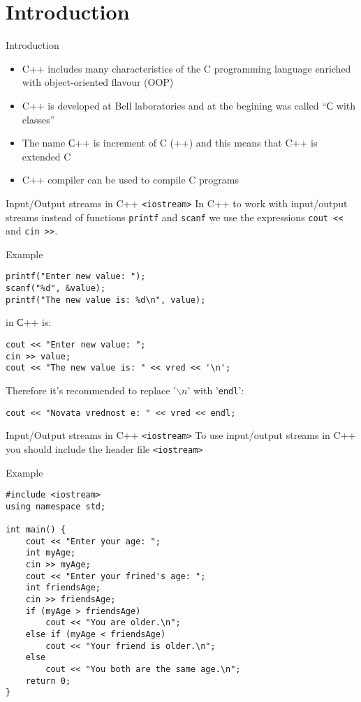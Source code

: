 \section{Introduction}

\begin{frame}{Introduction}
\begin{itemize}
  \item C++ includes many characteristics of the C programming language enriched
  with object-oriented flavour (OOP)
\item C++ is developed at Bell laboratories and at the begining was called ``С
with classes''
\item The name С++ is increment of C (++) and this means that C++ is extended C
\item C++ compiler can be used to compile C programs
\end{itemize}
\end{frame}

\begin{frame}[fragile]{Input/Output streams in C++ \texttt{<iostream>}}
In C++ to work with input/output streams instead of functions \texttt{printf}
and \texttt{scanf} we use the expressions \texttt{cout <<} and \texttt{cin >>}.
\begin{exampleblock}{Example}
\begin{lstlisting}
printf("Enter new value: ");
scanf("%d", &value);
printf("The new value is: %d\n", value);
\end{lstlisting}
in С++ is:
\begin{lstlisting}
cout << "Enter new value: ";
cin >> value;
cout << "The new value is: " << vred << '\n';
\end{lstlisting}
Therefore it's recommended to replace '${\backslash n}$' with '\texttt{endl}':
\begin{lstlisting}
cout << "Novata vrednost e: " << vred << endl;
\end{lstlisting}
\end{exampleblock}
\end{frame}

\begin{frame}[fragile]{Input/Output streams in C++ \texttt{<iostream>}}
To use input/output streams in C++ you should include the header file
\texttt{<iostream>}
\begin{exampleblock}{Example}
\begin{lstlisting}
#include <iostream>
using namespace std;

int main() {
    cout << "Enter your age: ";
    int myAge;
    cin >> myAge;
    cout << "Enter your frined's age: ";
    int friendsAge;
    cin >> friendsAge;
    if (myAge > friendsAge)
        cout << "You are older.\n";
    else if (myAge < friendsAge)
        cout << "Your friend is older.\n";
    else
        cout << "You both are the same age.\n";
    return 0;
}
\end{lstlisting}

\end{exampleblock}
\end{frame}

